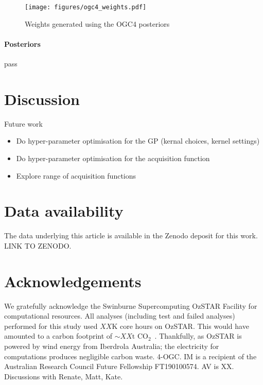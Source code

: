 \documentclass[twocolumn]{aastex631}
\begin{document}
\begin{figure}[ht!]
    \begin{centering}
        \texttt{[image: figures/ogc4\_weights.pdf]}
        \caption{
            Weights generated using the OGC4 posteriors
        }
        \label{fig:ogc4_weights}
    \end{centering}
\end{figure}


\paragraph{Posteriors}
pass


\section{Discussion}
\label{sec:discussion}

Future work
\begin{itemize}
    \item Do hyper-parameter optimisation for the GP (kernal choices, kernel settings) 
    \item Do hyper-parameter optimisation for the acquisition function 
    \item Explore range of acquisition functions
\end{itemize}


\section*{Data availability}
The data underlying this article is available in the Zenodo deposit for this work. LINK TO ZENODO.

\section*{Acknowledgements}
We gratefully acknowledge the Swinburne Supercomputing OzSTAR Facility for computational resources. All analyses (including test and failed analyses) performed for this study used $XX$K core hours on OzSTAR. This would have amounted to a carbon footprint of ${\sim XX{\text{t CO}_2}}$~\citep{greenhouse, energy_to_co2_converter}. Thankfully, as OzSTAR is powered by wind energy from Iberdrola Australia; the electricity for computations produces negligible carbon waste.
4-OGC.
IM is a recipient of the Australian Research Council Future Fellowship FT190100574.
AV is XX.
Discussions with Renate, Matt, Kate.
\end{document}
